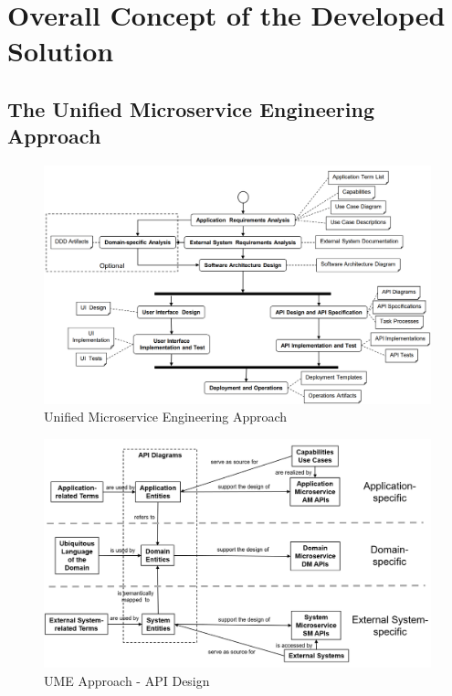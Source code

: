 \chapter{Overall Concept of the Developed Solution}
\label{cha:concept}


\section{The Unified Microservice Engineering Approach}
\label{sec:ume_approach}


\begin{figure}[tb]
	\centering
	\includegraphics[width=\textwidth]{figures/ume_approach.png}
	\caption{Unified Microservice Engineering Approach \cite{CM-W-OVW}}
	\label{fig:ume_approach}
\end{figure}

\begin{figure}[tb]
	\centering
	\includegraphics[width=\textwidth]{figures/ume_approach_api_design.png}
	\caption{UME Approach - API Design \cite{CM-W-DES}}
	\label{fig:ume_approach_api_design}
\end{figure}


